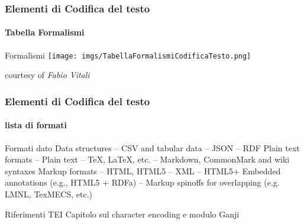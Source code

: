 





\begin{frame}
    \frametitle{Elementi di Codifica del testo}
    \framesubtitle{Tabella Formalismi}
    \addtocounter{nframe}{1}
    
    \begin{block}{Formalismi}
	    \texttt{[image: imgs/TabellaFormalismiCodificaTesto.png]}
    \end{block}
    courtesy of \textit{Fabio Vitali}

\end{frame}


\begin{frame}
    \frametitle{Elementi di Codifica del testo}
    \framesubtitle{lista di formati}
    \addtocounter{nframe}{1}
    
    \begin{block}{Formati dato}
Data structures – CSV and tabular data
– JSON
– RDF
Plain text formats – Plain text
– TeX, LaTeX, etc.
– Markdown, CommonMark and wiki syntaxes
Markup formats
– HTML, HTML5
– XML
– HTML5+ Embedded annotations (e.g., HTML5 + RDFa)
– Markup spinoffs for overlapping (e.g. LMNL, TexMECS, etc.) 

    \end{block}

    \begin{block}{Riferimenti TEI}
        Capitolo sul character encoding e modulo Ganji 
    \end{block}

\end{frame}


